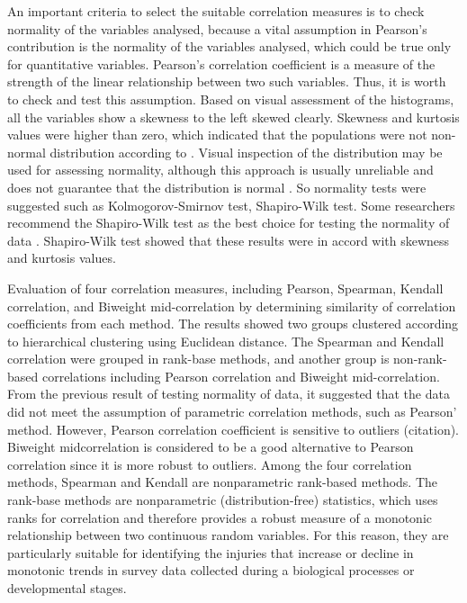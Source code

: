 An important criteria to select the suitable correlation measures is to check normality of the variables analysed, because a vital assumption in Pearson’s contribution is the normality of the variables analysed, which could be true only for quantitative variables. Pearson’s correlation coefficient is a measure of the strength of the linear relationship between two such variables. Thus, it is worth to check and test this assumption. Based on visual assessment of the histograms, all the variables show a skewness to the left skewed clearly. Skewness and kurtosis values were higher than zero, which indicated that the populations were not non-normal distribution  according to \citet{Doane_2011_Measuring}. Visual inspection of the distribution may be used for assessing normality, although this approach is usually unreliable and does not guarantee that the distribution is normal \citep{Ghasemi_2012_Normality}. So normality tests were suggested such as Kolmogorov-Smirnov test, Shapiro-Wilk test. Some researchers recommend the Shapiro-Wilk test as the best choice for testing the normality of data \citep{Peat_2005_Guide}. Shapiro-Wilk test showed that these results were in accord with skewness and kurtosis values.

Evaluation of four correlation measures, including Pearson, Spearman, Kendall correlation, and Biweight mid-correlation by determining similarity of correlation coefficients from each method. The results showed two groups clustered according to hierarchical clustering using Euclidean distance. The Spearman and Kendall correlation were grouped in rank-base methods, and another group is non-rank-based correlations including Pearson correlation and Biweight mid-correlation. From the previous result of testing normality of data, it suggested that the data did not meet the assumption of parametric correlation methods, such as Pearson' method. However, Pearson correlation coefficient is sensitive to outliers (citation). Biweight midcorrelation is considered to be a good alternative to Pearson correlation since it is more robust to outliers\citep{Wilcox_2012_Introduction}. Among the four correlation methods, Spearman and Kendall are nonparametric rank-based methods. The rank-base methods are nonparametric (distribution-free) statistics, which uses ranks for correlation and therefore provides a robust measure of a monotonic relationship between two continuous random variables. For this reason, they are particularly suitable for identifying the injuries that increase or decline in monotonic trends in survey data collected during a biological processes or developmental stages.

